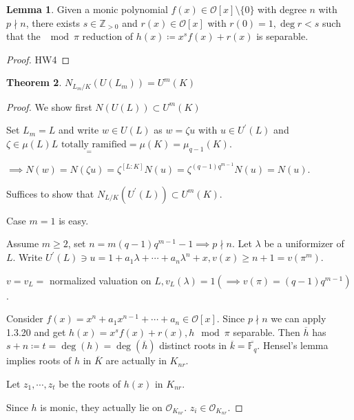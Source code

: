 \documentclass{article}
\theoremstyle{definition}
\newtheorem{theorem}{Theorem}
\numberwithin{theorem}{subsection}
\newtheorem{lemma}[theorem]{Lemma}
\begin{document}
    \begin{lemma}
        Given a monic polynomial \(f(x) \in \mathcal{O} [x] \setminus \{ 0 \}\) with degree \(n\) with \(p\nmid n\), there exists \(s\in \mathbb{Z}_{> 0}\) and \(r(x) \in \mathcal{O} [x]\) with \(r(0)=1, \deg r < s\) such that the \(\mod\pi\) reduction of \(h(x)\coloneqq x^s f(x) + r(x)\) is separable.
    \end{lemma}

    \begin{proof}
        HW4
    \end{proof}

    \begin{theorem}
        \(N_{L_m / K}(U(L_m)) = U^m (K)\) 
    \end{theorem}

    \begin{proof}

        We show first \(N(U(L)) \subset U^m(K)\) 
        
        Set \(L_m = L\) and write \(w\in U(L)\) as \(w = \zeta u\) with \(u\in U^{\prime} (L)\) and \(\zeta \in \mu(L) \underset{=}{L \text{ totally ramified}} = \mu(K)=\mu_{q-1}(K)\).

        \(\implies N(w) = N(\zeta u) = \zeta^{[L:K]} N(u) = \zeta^{(q-1)q^{m-1}}N(u) = N(u)\).
        
        Suffices to show that \(N_{L / K}(U^{\prime}(L)) \subset U^m(K)\).

        Case \(m= 1\) is easy.

        Assume \(m \geq 2\), set \(n = m (q-1)q^{m-1} - 1 \implies p\nmid n.\) Let \(\lambda\) be a uniformizer of \(L\). Write \(U^{\prime} (L) \ni u = 1 + a_1 \lambda + \cdots + a_n \lambda^n + x, v(x) \geq n+1 = v(\pi^m)\).

        \(v = v_L =\) normalized valuation on \(L, v_L(\lambda) = 1 (\implies v(\pi) = (q-1)q^{m-1})\).

        Consider \(f(x) = x^n + a_1 x^{n-1} + \cdots + a_n \in \mathcal{O}[x]\). Since \(p\nmid n\) we can apply 1.3.20 and get \(h(x) = x^s f(x) + r(x), h \mod \pi\) separable. Then \(\overline{h}\) has \(s + n \coloneqq t = \deg(h) = \deg(\overline{h})\) distinct roots in \(\overline{k} = \overline{\mathbb{F}_q}\). Hensel's lemma implies roots of \(h\) in \(\overline{K}\) are actually in \(K_{nr}\).

        Let \(z_1, \cdots , z_t\) be the roots of \(h(x)\) in \(K_{nr}\).

        Since \(h\) is monic, they actually lie on \(\mathcal{O}_{K_{nr}}\). \(z_i \in \mathcal{O}_{K_{nr}}\).


\end{proof}
\end{document}
